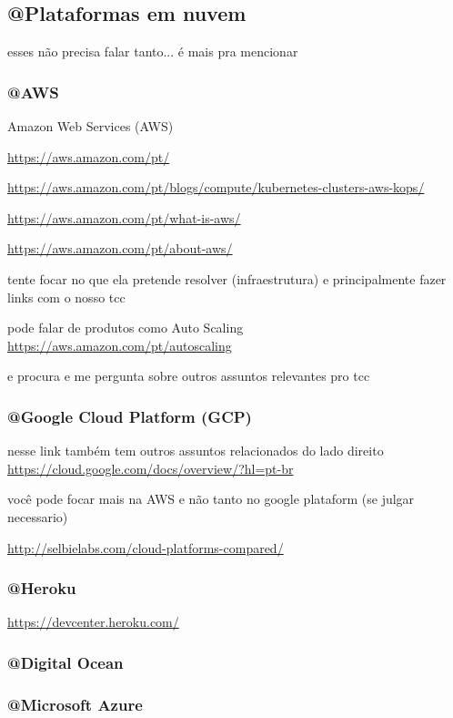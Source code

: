 
\subsection{@Plataformas em nuvem}

esses não precisa falar tanto... é mais pra mencionar

\subsubsection{@AWS}

Amazon Web Services (AWS)

\url{https://aws.amazon.com/pt/}

\url{https://aws.amazon.com/pt/blogs/compute/kubernetes-clusters-aws-kops/}

\url{https://aws.amazon.com/pt/what-is-aws/}

\url{https://aws.amazon.com/pt/about-aws/}

tente focar no que ela pretende resolver (infraestrutura) e principalmente
fazer links com o nosso tcc

pode falar de produtos como Auto Scaling
\url{https://aws.amazon.com/pt/autoscaling}

e procura e me pergunta sobre outros assuntos relevantes pro tcc



\subsubsection{@Google Cloud Platform (GCP)}

nesse link também tem outros assuntos relacionados do lado direito
\url{https://cloud.google.com/docs/overview/?hl=pt-br}

você pode focar mais na AWS e não tanto no google plataform (se julgar necessario)


\url{http://selbielabs.com/cloud-platforms-compared/}

\subsubsection{@Heroku}

\url{https://devcenter.heroku.com/}

\subsubsection{@Digital Ocean}

\subsubsection{@Microsoft Azure}
